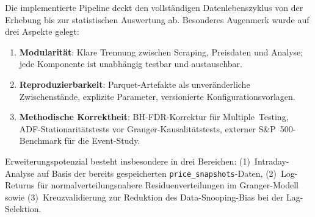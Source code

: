 \documentclass[11pt, a4paper]{article}
\begin{document}
Die implementierte Pipeline deckt den vollständigen Datenlebenszyklus von der
Erhebung bis zur statistischen Auswertung ab. Besonderes Augenmerk wurde auf
drei Aspekte gelegt:

\begin{enumerate}[noitemsep]
  \item \textbf{Modularität}: Klare Trennung zwischen Scraping, Preisdaten und
        Analyse; jede Komponente ist unabhängig testbar und austauschbar.
  \item \textbf{Reproduzierbarkeit}: Parquet-Artefakte als unveränderliche
        Zwischenstände, explizite Parameter, versionierte Konfigurationsvorlagen.
  \item \textbf{Methodische Korrektheit}: BH-FDR-Korrektur für Multiple~Testing,
        ADF-Stationaritätstests vor Granger-Kausalitätstests,
        externer S\&P~500-Benchmark für die Event-Study.
\end{enumerate}

Erweiterungspotenzial besteht insbesondere in drei Bereichen:
(1)~Intraday-Analyse auf Basis der bereits gespeicherten
\texttt{price\_snapshots}-Daten,
(2)~Log-Returns für normalverteilungsnahere Residuenverteilungen im
Granger-Modell sowie
(3)~Kreuzvalidierung zur Reduktion des Data-Snooping-Bias bei der Lag-Selektion.

\printbibliography[heading=bibintoc]
\end{document}
